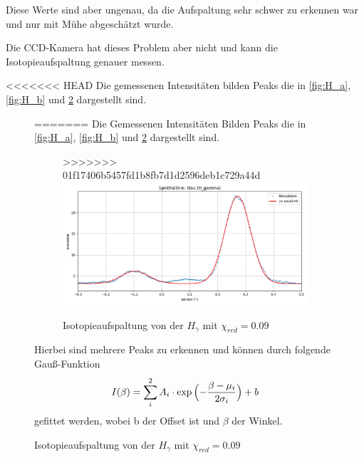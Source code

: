 Diese Werte sind aber ungenau, da die Aufspaltung sehr schwer zu erkennen war und nur mit Mühe abgeschätzt wurde.

Die CCD-Kamera hat dieses Problem aber nicht und kann die Isotopieaufspaltung genauer messen.

<<<<<<< HEAD
Die gemessenen Intensitäten bilden Peaks die in \cref{fig:H_a}, \cref{fig:H_b} und \cref{fig:H_g} dargestellt sind. 
\begin{figure}
=======
Die Gemessenen Intensitäten Bilden Peaks die in \cref{fig:H_a}, \cref{fig:H_b} und \cref{fig:H_g} dargestellt sind. 
\begin{figure}[H]
>>>>>>> 01f17406b5457fd1b8fb7d1d2596deb1c729a44d
    \centering
    \includegraphics[width=\linewidth]{figs/dt_lila_145_51_5.png}
    \caption{Isotopieaufspaltung von der $H_{\gamma}$ mit $\chi_{red} = 0.09$}
    \label{fig:H_g}
\end{figure}

Hierbei sind mehrere Peaks zu erkennen und können durch folgende Gauß-Funktion 
\begin{equation}
    I(\beta) = \sum_i^2 A_i \cdot \exp{\Bigl(-\frac{\beta-\mu_i}{2\sigma_i}}\Bigr) +b
\end{equation}
gefittet werden, wobei b der Offset ist und $\beta$ der Winkel. 


\end{figure}

